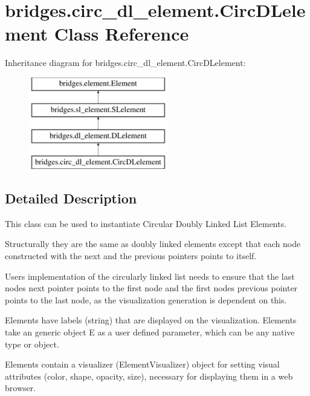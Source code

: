 \hypertarget{classbridges_1_1circ__dl__element_1_1_circ_d_lelement}{}\section{bridges.\+circ\+\_\+dl\+\_\+element.\+Circ\+D\+Lelement Class Reference}
\label{classbridges_1_1circ__dl__element_1_1_circ_d_lelement}
Inheritance diagram for bridges.\+circ\+\_\+dl\+\_\+element.\+Circ\+D\+Lelement\+:\begin{figure}[H]
\begin{center}
\leavevmode
\includegraphics[height=4.000000cm]{classbridges_1_1circ__dl__element_1_1_circ_d_lelement}
\end{center}
\end{figure}


\subsection{Detailed Description}
This class can be used to instantiate Circular Doubly Linked List Elements. 

Structurally they are the same as doubly linked elements except that each node constructed with the next and the previous pointers points to itself.

User\textquotesingle{}s implementation of the circularly linked list needs to ensure that the last node\textquotesingle{}s next pointer points to the first node and the first node\textquotesingle{}s previous pointer points to the last node, as the visualization generation is dependent on this.

Elements have labels (string) that are displayed on the visualization. Elements take an generic object E as a user defined parameter, which can be any native type or object.

Elements contain a visualizer (Element\+Visualizer) object for setting visual attributes (color, shape, opacity, size), necessary for displaying them in a web browser.

